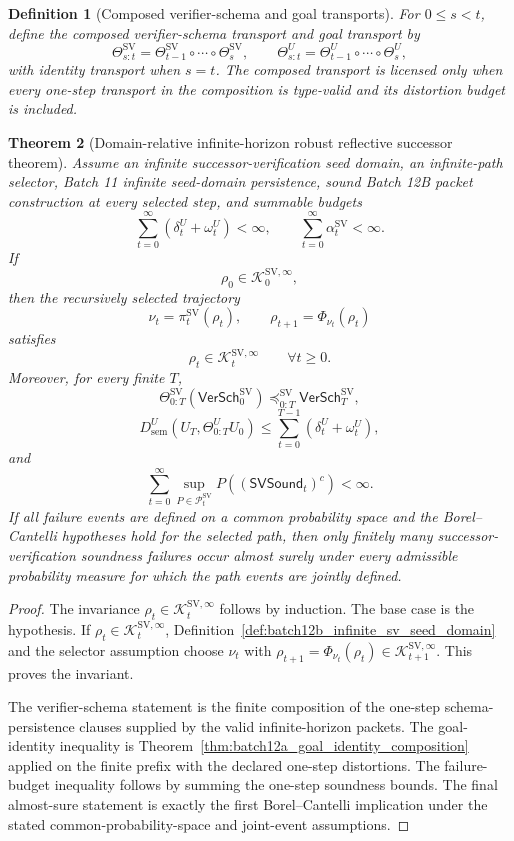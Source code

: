 \documentclass[11pt]{article}
\newtheorem{theorem}{Theorem}[section]
\newtheorem{definition}[theorem]{Definition}
\newcommand{\Pcal}{\mathcal{P}}
\newcommand{\1}{\mathbf{1}}
\providecommand{\Kcal}{\mathcal{K}}
\providecommand{\sem}{\mathrm{sem}}
\begin{document}
\begin{definition}[Composed verifier-schema and goal transports]
\label{def:batch12b_composed_sv_goal_transports}
For \(0\le s<t\), define the composed verifier-schema transport and goal transport by
\[
\Theta_{s:t}^{\mathrm{SV}}=\Theta_{t-1}^{\mathrm{SV}}\circ\cdots\circ\Theta_s^{\mathrm{SV}},
\qquad
\Theta_{s:t}^{U}=\Theta_{t-1}^{U}\circ\cdots\circ\Theta_s^{U},
\]
with identity transport when \(s=t\).  The composed transport is licensed only when every one-step transport in the composition is type-valid and its distortion budget is included.
\end{definition}

\begin{theorem}[Domain-relative infinite-horizon robust reflective successor theorem]
\label{thm:batch12b_domain_relative_infinite_rrst}
Assume an infinite successor-verification seed domain, an infinite-path selector, Batch 11 infinite seed-domain persistence, sound Batch 12B packet construction at every selected step, and summable budgets
\[
\sum_{t=0}^{\infty}(\delta_t^U+\omega_t^U)<\infty,
\qquad
\sum_{t=0}^{\infty}\alpha_t^{\mathrm{SV}}<\infty.
\]
If
\[
\rho_0\in\Kcal_0^{\mathrm{SV},\infty},
\]
then the recursively selected trajectory
\[
\nu_t=\pi_t^{\mathrm{SV}}(\rho_t),
\qquad
\rho_{t+1}=\Phi_{\nu_t}(\rho_t)
\]
satisfies
\[
\rho_t\in\Kcal_t^{\mathrm{SV},\infty}\qquad\forall t\ge0.
\]
Moreover, for every finite \(T\),
\[
\Theta_{0:T}^{\mathrm{SV}}(\mathsf{VerSch}_0^{\mathrm{SV}})
\preceq_{0:T}^{\mathrm{SV}}
\mathsf{VerSch}_T^{\mathrm{SV}},
\]
\[
D_{\sem}^U(U_T,\Theta_{0:T}^UU_0)
\le
\sum_{t=0}^{T-1}(\delta_t^U+\omega_t^U),
\]
and
\[
\sum_{t=0}^{\infty}\sup_{P\in\Pcal_t^{\mathrm{SV}}}P((\mathsf{SVSound}_t)^c)<\infty.
\]
If all failure events are defined on a common probability space and the Borel--Cantelli hypotheses hold for the selected path, then only finitely many successor-verification soundness failures occur almost surely under every admissible probability measure for which the path events are jointly defined.
\end{theorem}

\begin{proof}
The invariance \(\rho_t\in\Kcal_t^{\mathrm{SV},\infty}\) follows by induction.  The base case is the hypothesis.  If \(\rho_t\in\Kcal_t^{\mathrm{SV},\infty}\), Definition~\ref{def:batch12b_infinite_sv_seed_domain} and the selector assumption choose \(\nu_t\) with \(\rho_{t+1}=\Phi_{\nu_t}(\rho_t)\in\Kcal_{t+1}^{\mathrm{SV},\infty}\).  This proves the invariant.

The verifier-schema statement is the finite composition of the one-step schema-persistence clauses supplied by the valid infinite-horizon packets.  The goal-identity inequality is Theorem~\ref{thm:batch12a_goal_identity_composition} applied on the finite prefix with the declared one-step distortions.  The failure-budget inequality follows by summing the one-step soundness bounds.  The final almost-sure statement is exactly the first Borel--Cantelli implication under the stated common-probability-space and joint-event assumptions.
\end{proof}
\end{document}
